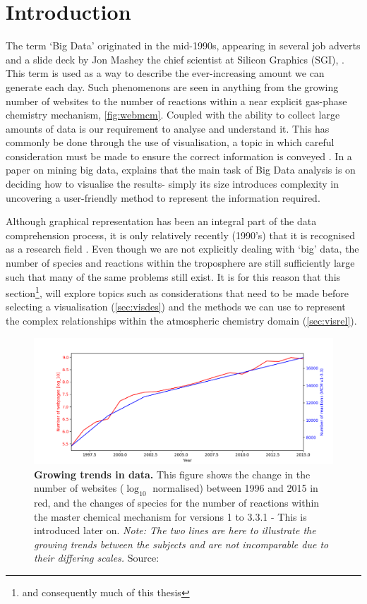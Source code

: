 
\section{Introduction}
The term `Big Data' originated in the mid-1990s, appearing in several job adverts and a slide deck by Jon Mashey the chief scientist at Silicon Graphics (SGI), \cite{slidedeck,bigdataorigin}. This term is used as a way to describe the ever-increasing amount we can generate each day. Such phenomenons are seen in anything from the growing number of websites to the number of reactions within a near explicit gas-phase chemistry mechanism, \autoref{fig:webmcm}. Coupled with the ability to collect large amounts of data is our requirement to analyse and understand it. This has commonly be done through the use of visualisation, a topic in which careful consideration must be made to ensure the correct information is conveyed \cite{kirk}. In a paper on mining big data, \cite{bigdatamine} explains that the main task of Big
Data analysis is on deciding how to visualise the results- simply its size introduces complexity in uncovering a user-friendly method to represent the information required. 

Although graphical representation has been an integral part of the data comprehension process, it is only relatively recently (1990's) that it is recognised as a research field \cite{ch6}. Even though we are not explicitly dealing with `big' data, the number of species and reactions within the troposphere are still sufficiently large such that many of the same problems still exist. It is for this reason that this section\footnote{and consequently much of this thesis}, will explore topics such as considerations that need to be made before selecting a visualisation (\autoref{sec:visdes}) and the methods we can use to represent the complex relationships within the atmospheric chemistry domain (\autoref{sec:visrel}). 

\begin{figure}[H]
     \centering
         \includegraphics[width=.95\textwidth]{figures_c1/webmcm.png}
         \caption{\textbf{Growing trends in data.} This figure shows the change in the number of websites ($\log_{10}$ normalised) between 1996 and 2015 in red, and the changes of species for the number of reactions within the master chemical mechanism for versions 1 to 3.3.1 - This is introduced later on. \emph{Note: The two lines are here to illustrate the growing trends between the subjects and are not incomparable due to their differing scales.}  Source: \cite{webstats,mcmhist}}
         \label{fig:webmcm}
\end{figure}


